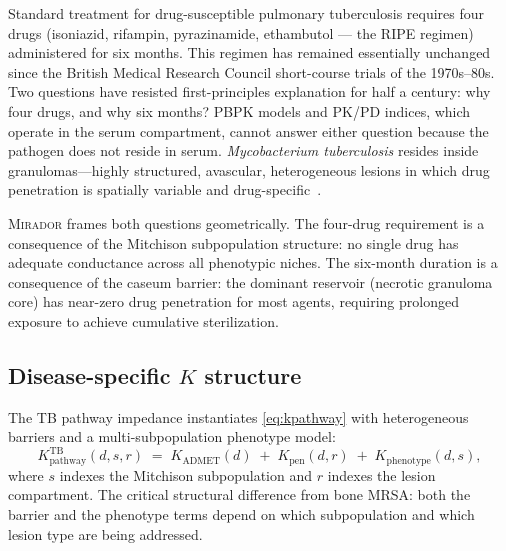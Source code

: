 \documentclass[11pt]{article}
\theoremstyle{plain}
\theoremstyle{definition}
\newcommand{\mirador}{\textsc{Mirador}}
\newcommand{\Kpath}{K_{\mathrm{pathway}}}
\newcommand{\Kpheno}{K_{\mathrm{phenotype}}}
\newcommand{\Kadmet}{K_{\mathrm{ADMET}}}
\begin{document}
Standard treatment for drug-susceptible pulmonary tuberculosis
requires four drugs (isoniazid, rifampin, pyrazinamide, ethambutol
--- the RIPE regimen) administered for six months. This regimen has
remained essentially unchanged since the British Medical Research
Council short-course trials of the 1970s--80s. Two questions have
resisted first-principles explanation for half a century: why four
drugs, and why six months? PBPK models and PK/PD indices, which
operate in the serum compartment, cannot answer either question
because the pathogen does not reside in serum. \emph{Mycobacterium
tuberculosis} resides inside granulomas---highly structured,
avascular, heterogeneous lesions in which drug penetration is
spatially variable and drug-specific~\cite{Dartois2014,
Prideaux2015}.

\mirador{} frames both questions geometrically. The four-drug
requirement is a consequence of the Mitchison subpopulation
structure: no single drug has adequate conductance across all
phenotypic niches. The six-month duration is a consequence of the
caseum barrier: the dominant reservoir (necrotic granuloma core)
has near-zero drug penetration for most agents, requiring prolonged
exposure to achieve cumulative sterilization.

\subsection{Disease-specific \texorpdfstring{$K$}{K} structure}
\label{sec:tb-k}

The TB pathway impedance instantiates \cref{eq:kpathway} with
heterogeneous barriers and a multi-subpopulation phenotype model:
\begin{equation}
  \label{eq:k-tb}
  \Kpath^{\mathrm{TB}}(d, s, r) \;=\;
  \Kadmet(d) \;+\; K_{\mathrm{pen}}(d, r)
  \;+\; \Kpheno(d, s),
\end{equation}
where $s$ indexes the Mitchison subpopulation and $r$ indexes the
lesion compartment. The critical structural difference from bone
MRSA: both the barrier and the phenotype terms depend on which
subpopulation and which lesion type are being addressed.
\end{document}
